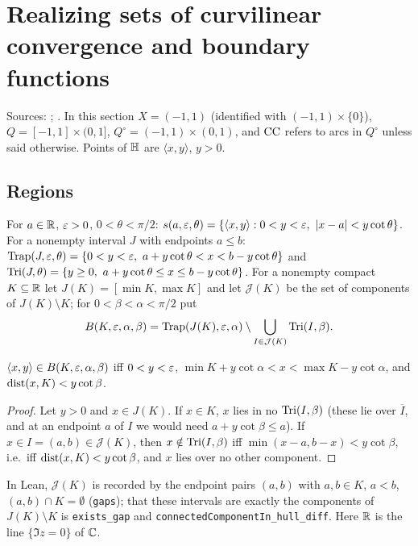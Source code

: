\section{Realizing sets of curvilinear convergence and boundary functions}\label{sec:construct}
Sources: \cite[(A)--(F)]{TAMSb}; \cite[\S\S4--5, Lemmas 9--17, Theorems 4, 6, 7]{Diss}. In this
section $X=(-1,1)$ (identified with $(-1,1)\times\{0\}$), $Q=[-1,1]\times(0,1]$, $Q^\circ=(-1,1)\times(0,1)$,
and $\operatorname{CC}$ refers to arcs in $Q^\circ$ unless said otherwise. Points of $\mathbb{H}$ are $\langle x,y\rangle$, $y>0$.

\subsection{Regions}

\begin{definition}\label{def:regions}
For $a\in\mathbb{R}$, $\varepsilon>0$, $0<\theta<\pi/2$:
$s(a,\varepsilon,\theta)=\{\langle x,y\rangle:0<y<\varepsilon,\ \lvert x-a\rvert<y\cot\theta\}$.
For a nonempty interval $J$ with endpoints $a\le b$: $\Trap(J,\eps,\theta)=\{0<y<\eps,\ a+y\cot\theta<x<b-y\cot\theta\}$
and $\operatorname{Tri}(J,\theta)=\{y\ge0,\ a+y\cot\theta\le x\le b-y\cot\theta\}$. For a nonempty compact $K\subseteq\mathbb{R}$ let
$J(K)=[\min K,\max K]$ and let $\mathcal J(K)$ be the set of components of $J(K)\setminus K$; for
$0<\beta<\alpha<\pi/2$ put
\[
B(K,\varepsilon,\alpha,\beta)=\operatorname{Trap}(J(K),\varepsilon,\alpha)\setminus\bigcup_{I\in\mathcal J(K)}\operatorname{Tri}(I,\beta).
\]
\end{definition}

\begin{lemma}[description of $B$]\label{lem:B-char}
$\langle x,y\rangle\in B(K,\varepsilon,\alpha,\beta)$ iff $0<y<\varepsilon$, $\min K+y\cot\alpha<x<\max K-y\cot\alpha$, and
$\operatorname{dist}(x,K)<y\cot\beta$.
\end{lemma}
\begin{proof}
Let $y>0$ and $x\in J(K)$. If $x\in K$, $x$ lies in no $\operatorname{Tri}(I,\beta)$ (these lie over $\overline I$, and at an
endpoint $a$ of $I$ we would need $a+y\cot\beta\le a$). If $x\in I=(a,b)\in\mathcal J(K)$, then $x\notin\operatorname{Tri}(I,\beta)$
iff $\min(x-a,b-x)<y\cot\beta$, i.e.\ iff $\operatorname{dist}(x,K)<y\cot\beta$, and $x$ lies over no other component.
\end{proof}
In Lean, $\mathcal J(K)$ is recorded by the endpoint pairs $(a,b)$ with $a,b\in K$, $a<b$, $(a,b)\cap K=\emptyset$
(\texttt{gaps}); that these intervals are exactly the components of $J(K)\setminus K$ is
\texttt{exists\_gap} and \texttt{connectedComponentIn\_hull\_diff}. Here $\mathbb{R}$ is the line $\{\Im z=0\}$ of $\mathbb{C}$.

